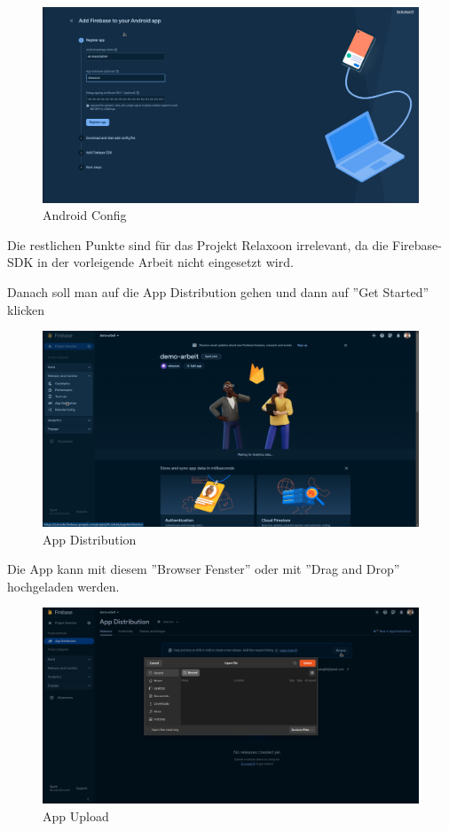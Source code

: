 \begin{figure}[H]

  \includegraphics[width=\textwidth]{./pics/firebase2.png}
  \caption{Android Config}
\end{figure}

Die restlichen Punkte sind für das Projekt Relaxoon irrelevant,
da die Firebase-SDK in der vorleigende Arbeit nicht eingesetzt wird.


Danach soll man  auf die App Distribution gehen und dann auf ''Get Started'' klicken
\begin{figure}[H]
  \includegraphics[width=\textwidth]{./pics/firebase3.png}
  \caption{App Distribution}
\end{figure}

Die App kann mit diesem ''Browser Fenster'' oder mit ''Drag and Drop'' hochgeladen werden.
\begin{figure}[H]
  \includegraphics[width=\textwidth]{./pics/firebase4.png}
  \caption{App Upload}

\end{figure}


